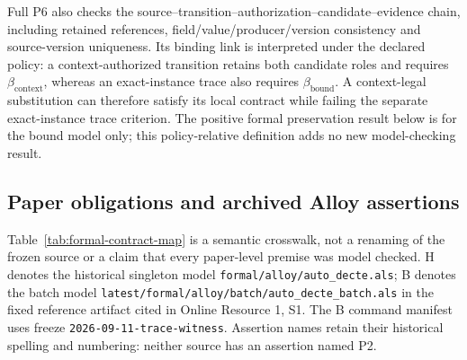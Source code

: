 Full P6 also checks the source--transition--authorization--candidate--evidence
chain, including retained references, field/value/producer/version consistency
and source-version uniqueness. Its binding link is interpreted under the
declared policy: a context-authorized transition retains both candidate roles
and requires $\beta_{\mathrm{context}}$, whereas an exact-instance trace also
requires $\beta_{\mathrm{bound}}$. A context-legal substitution can therefore
satisfy its local contract while failing the separate exact-instance trace
criterion. The positive formal preservation result below is for the bound
model only; this policy-relative definition adds no new model-checking result.

\subsection{Paper obligations and archived Alloy assertions}
\label{app:formal-mapping}
Table~\ref{tab:formal-contract-map} is a semantic crosswalk, not a renaming of
the frozen source or a claim that every paper-level premise was model checked.
\textsf{H} denotes the historical singleton model
\nolinkurl{formal/alloy/auto_decte.als}; \textsf{B} denotes the batch model
\nolinkurl{latest/formal/alloy/batch/auto_decte_batch.als} in the fixed reference
artifact cited in Online Resource 1, S1. The \textsf{B} command manifest uses
freeze \nolinkurl{2026-09-11-trace-witness}. Assertion names retain their
historical spelling and numbering: neither source has an assertion named P2.

